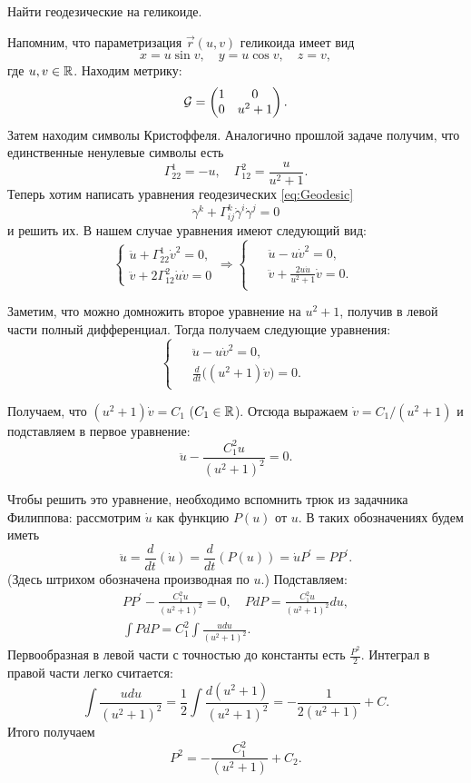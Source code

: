 \begin{problem}
	Найти геодезические на геликоиде.
\end{problem}

\begin{solution}
	Напомним, что параметризация $\vec{r}(u, v)$ геликоида имеет вид
	\[
		x = u\sin v,\quad y = u\cos v,\quad z = v,
	\]
	где $u, v \in \mathbb{R}$. Находим метрику:
	\[
		\mathcal{G} =
		\begin{pmatrix}
			1 & 0\\
			0 & u^2 + 1
		\end{pmatrix}.
	\]
	Затем находим символы Кристоффеля. Аналогично прошлой задаче получим, что единственные ненулевые символы есть
	\[
		\Gamma_{22}^1 = -u,\quad \Gamma_{12}^2 = \frac{u}{u^2 + 1}.
	\]
	Теперь хотим написать уравнения геодезических \eqref{eq:Geodesic}
	\[
		\ddot{\gamma}^k + \Gamma_{ij}^k\dot{\gamma}^i\dot{\gamma}^j = 0
	\]
	и решить их. В нашем случае уравнения имеют следующий вид:
	\[
		\begin{cases}
			\ddot{u} + \Gamma_{22}^1\dot{v}^2 = 0,\\
			\ddot{v} + 2\Gamma_{12}^2\dot{u}\dot{v} = 0
		\end{cases} \Rightarrow
		\begin{cases}
			\begin{aligned}
				&\ddot{u} - u\dot{v}^2 = 0,\\
				&\ddot{v} + \frac{2u\dot{u}}{u^2 + 1}\dot{v} = 0.
			\end{aligned}
		\end{cases}
	\]

	Заметим, что можно домножить второе уравнение на $u^2 + 1$, получив в левой части полный дифференциал. Тогда получаем следующие уравнения:
	\[
		\begin{cases}
			\begin{aligned}
				&\ddot{u} - u\dot{v}^2 = 0,\\
				&\frac{d}{dt}\big((u^2 + 1)\dot{v}\big) = 0.
			\end{aligned}
		\end{cases}
	\]

	Получаем, что $(u^2 + 1)\dot{v} = C_1$ ($C_1 \in \mathbb{R}$). Отсюда выражаем $\dot{v} = C_1 / (u^2 + 1)$ и подставляем в первое уравнение:
	\[
		\ddot{u} - \frac{C_1^2u}{(u^2 + 1)^2} = 0.
	\]

	Чтобы решить это уравнение, необходимо вспомнить трюк из задачника Филиппова: рассмотрим $\dot{u}$ как функцию $P(u)$ от $u$. В таких обозначениях будем иметь
	\[
		\ddot{u} = \frac{d}{dt}(\dot{u}) = \frac{d}{dt}(P(u)) = \dot{u}P^\prime = PP^\prime.
	\]
	(Здесь штрихом обозначена производная по $u$.) Подставляем:
	\begin{gather*}
		PP^\prime - \frac{C_1^2u}{(u^2 + 1)^2} = 0,\quad PdP = \frac{C_1^2u}{(u^2 + 1)^2}du,\\
		\int PdP = C_1^2\int\frac{udu}{(u^2 + 1)^2}.
	\end{gather*}
	Первообразная в левой части с точностью до константы есть $\frac{P^2}{2}$. Интеграл в правой части легко считается:
	\[
		\int\frac{udu}{(u^2 + 1)^2} = \frac{1}{2}\int\frac{d(u^2 + 1)}{(u^2 + 1)^2} = -\frac{1}{2(u^2 + 1)} + C.
	\]
	Итого получаем
	\[
		P^2 = -\frac{C_1^2}{(u^2 + 1)} + C_2.
	\]


\end{solution}
